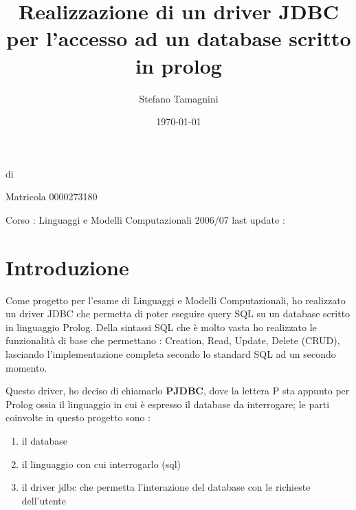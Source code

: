 \documentclass[a4paper,titlepage,12pt]{article}	%
\title{Realizzazione di un driver JDBC per l'accesso ad un database scritto in prolog}
\author{Stefano Tamagnini}
\date{\today}
\makeatletter
\def\maketitle{%
  \null
  \thispagestyle{empty}%
  \vfill
  \begin{center}\leavevmode
    \normalfont
    {\huge \raggedright \@title \par}%
    \hrulefill \par
    di {\LARGE \raggedleft \@author \par }%
    {\raggedleft Matricola 0000273180 \par}%
    \vskip 3cm
    Corso : Linguaggi e Modelli Computazionali 2006/07
    \vskip 1cm
    last update : { \@date\par}%
  \end{center}%
  \vfill
  \null
  \cleardoublepage
  }
\makeatother
\begin{document}
\maketitle

\tableofcontents

\newpage

\section{Introduzione}

Come progetto per l'esame di Linguaggi e Modelli Computazionali, ho realizzato un driver JDBC che permetta di poter eseguire query SQL su un database scritto in linguaggio Prolog. Della sintassi SQL che è molto vasta ho realizzato le funzionalità di base che permettano : Creation, Read, Update, Delete (CRUD), lasciando l'implementazione completa secondo lo standard SQL ad un secondo momento.
\par 
Questo driver, ho deciso di chiamarlo {\bf PJDBC}, dove la lettera P sta appunto per Prolog ossia il linguaggio in cui è espresso il database da interrogare; le parti coinvolte in questo progetto sono : 
\begin{enumerate}
\item il database
\item il linguaggio con cui interrogarlo (sql)
\item il driver jdbc che permetta l'interazione del database con le richieste dell'utente
\end{enumerate}






	
\end{document}
